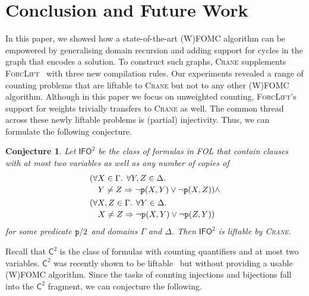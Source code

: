 \documentclass{article}
\newtheorem{conjecture}{Conjecture}
\theoremstyle{definition}
\newcommand{\Ctwo}{$\mathsf{C}^{2}$}
\newcommand{\IFO}{$\mathsf{I}\mathsf{FO}^{2}$}
\begin{document}
\section{Conclusion and Future Work}\label{sec:conclusion}

In this paper, we showed how a state-of-the-art (W)FOMC algorithm can be
empowered by generalising domain recursion and adding support for cycles in the
graph that encodes a solution. To construct such graphs, \textsc{Crane}
supplements \textsc{ForcLift}~\cite{DBLP:conf/ijcai/BroeckTMDR11} with three
new compilation rules. Our experiments revealed a range of counting problems
that are liftable to \textsc{Crane} but not to any other (W)FOMC algorithm.
Although in this paper we focus on unweighted counting, \textsc{ForcLift}'s
support for weights trivially transfers to \textsc{Crane} as well. The common
thread across these newly liftable problems is (partial) injectivity. Thus, we
can formulate the following conjecture.

\begin{conjecture}
  Let \IFO{} be the class of formulas in FOL that contain clauses with at most
  two variables as well as any number of copies of
  \begin{align*}
    &\begin{multlined}[t]
      (\forall X \in \Gamma\text{. }\forall Y, Z \in \Delta\text{. }\\
      Y \ne Z \Rightarrow \neg \texttt{\textup{p}}(X, Y) \lor \neg \texttt{\textup{p}}(X, Z)) \land
    \end{multlined}\\
    &\begin{multlined}[t]
      (\forall X, Z \in \Gamma\text{. }\forall Y \in \Delta\text{. }\\
      X \ne Z \Rightarrow \neg \texttt{\textup{p}}(X, Y) \lor \neg \texttt{\textup{p}}(Z, Y))
    \end{multlined}
  \end{align*}
  for some predicate $\texttt{\textup{p}}/2$ and domains $\Gamma$ and $\Delta$.
  Then \IFO{} is liftable by \textsc{Crane}.
\end{conjecture}

Recall that \Ctwo{} is the class of formulas with counting quantifiers and at
most two variables. \Ctwo{} was recently shown to be
liftable~\cite{DBLP:journals/jair/Kuzelka21} but without providing a usable
(W)FOMC algorithm. Since the tasks of counting injections and bijections fall
into the \Ctwo{} fragment, we can conjecture the following.
\end{document}
